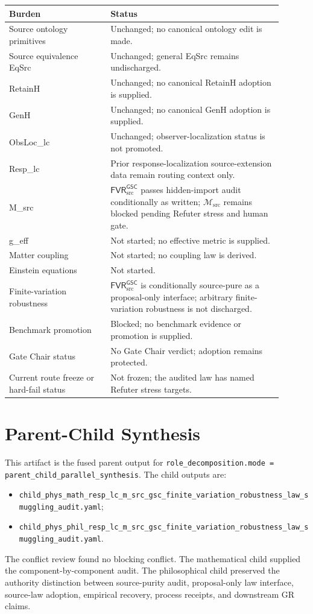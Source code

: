 \documentclass[11pt]{article}
\newcommand{\Msrc}{\mathcal{M}_{\mathrm{src}}}
\newcommand{\FVR}{\mathsf{FVR}_{\mathrm{src}}^{\mathsf{GSC}}}
\begin{document}
\begin{center}
\begin{tabular}{p{0.33\linewidth}p{0.57\linewidth}}
\hline
Burden & Status \\
\hline
Source ontology primitives & Unchanged; no canonical ontology edit is made. \\
Source equivalence EqSrc & Unchanged; general EqSrc remains undischarged. \\
RetainH & Unchanged; no canonical RetainH adoption is supplied. \\
GenH & Unchanged; no canonical GenH adoption is supplied. \\
ObsLoc\_lc & Unchanged; observer-localization status is not promoted. \\
Resp\_lc & Prior response-localization source-extension data remain routing context only. \\
M\_src & \(\FVR\) passes hidden-import audit conditionally as written; \(\Msrc\) remains blocked pending Refuter stress and human gate. \\
g\_eff & Not started; no effective metric is supplied. \\
Matter coupling & Not started; no coupling law is derived. \\
Einstein equations & Not started. \\
Finite-variation robustness & \(\FVR\) is conditionally source-pure as a proposal-only interface; arbitrary finite-variation robustness is not discharged. \\
Benchmark promotion & Blocked; no benchmark evidence or promotion is supplied. \\
Gate Chair status & No Gate Chair verdict; adoption remains protected. \\
Current route freeze or hard-fail status & Not frozen; the audited law has named Refuter stress targets. \\
\hline
\end{tabular}
\end{center}

\section{Parent-Child Synthesis}

This artifact is the fused parent output for
\texttt{role\_decomposition.mode = parent\_child\_parallel\_synthesis}. The
child outputs are:
\begin{itemize}
  \item \texttt{child\_phys\_math\_resp\_lc\_m\_src\_gsc\_finite\_variation\_robustness\_law\_smuggling\_audit.yaml};
  \item \texttt{child\_phys\_phil\_resp\_lc\_m\_src\_gsc\_finite\_variation\_robustness\_law\_smuggling\_audit.yaml}.
\end{itemize}
The conflict review found no blocking conflict. The mathematical child
supplied the component-by-component audit. The philosophical child preserved
the authority distinction between source-purity audit, proposal-only law
interface, source-law adoption, empirical recovery, process receipts, and
downstream GR claims.
\end{document}
